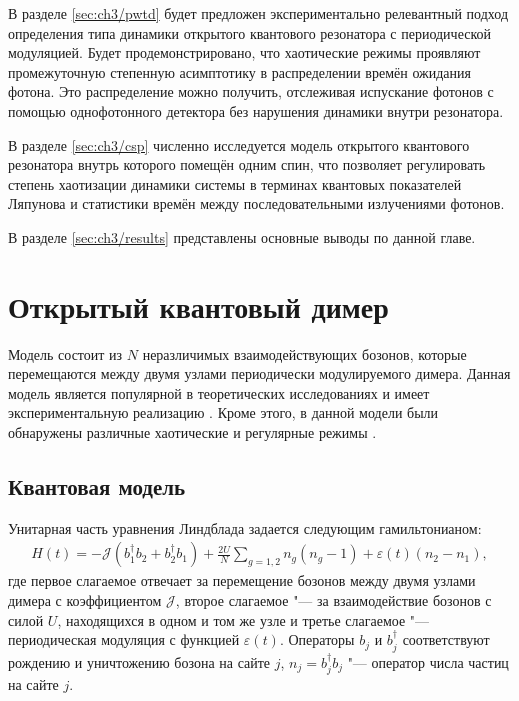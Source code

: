 В разделе \cref{sec:ch3/pwtd} будет предложен экспериментально релевантный подход определения типа динамики открытого квантового резонатора с периодической модуляцией. Будет продемонстрировано, что хаотические режимы проявляют промежуточную степенную асимптотику в распределении времён ожидания фотона. Это распределение можно получить, отслеживая испускание фотонов с помощью однофотонного детектора без нарушения динамики внутри резонатора.

В разделе \cref{sec:ch3/csp} численно исследуется модель открытого квантового резонатора внутрь которого помещён одним спин, что позволяет регулировать степень хаотизации динамики системы в терминах квантовых показателей Ляпунова и статистики времён между последовательными излучениями фотонов.

В разделе \cref{sec:ch3/results} представлены основные выводы по данной главе.

\section{Открытый квантовый димер}\label{sec:ch3/dimer}
Модель состоит из \(N\) неразличимых взаимодействующих бозонов, которые перемещаются между двумя узлами периодически модулируемого димера. 
Данная модель является популярной в теоретических исследованиях \cite{Vardi2001, Trimborn2008, Poletti2012} и имеет экспериментальную реализацию \cite{Gross2010, Tomkovic2017}. Кроме этого, в данной модели были обнаружены различные хаотические и регулярные режимы \cite{Hartmann2017, Ivanchenko2017, Carlo2017, Wang2018}. 

\subsection{Квантовая модель}\label{subsec:ch3/dimer/quantum}

Унитарная часть уравнения Линдблада  задается следующим гамильтонианом:
\begin{equation}
	\label{eq:dimer_H}
	\begin{gathered}
		H(t) = -\mathcal{J} \left(b^\dagger_1 b_2 + b^\dagger_2 b_1\right) + \frac{2 U}{N} \sum_{g=1,2} n_g \left(n_g - 1\right) + \varepsilon(t) \left(n_2 - n_1\right),
	\end{gathered}
\end{equation}
где первое слагаемое отвечает за перемещение бозонов между двумя узлами димера с коэффициентом \(\mathcal{J}\), второе слагаемое "--- за взаимодействие бозонов с силой \(U\), находящихся в  одном и том же узле и третье слагаемое "--- периодическая модуляция с функцией \(\varepsilon(t)\). 
Операторы \(b_j\) и \(b^\dagger_j\) соответствуют рождению и уничтожению бозона на сайте \(j\), \(n_j = b^\dagger_j b_j\) "--- оператор числа частиц на сайте \(j\).

